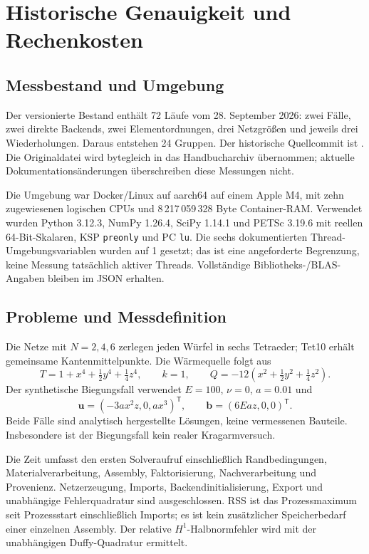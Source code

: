 \chapter{Historische Genauigkeit und Rechenkosten}
\section{Messbestand und Umgebung}
Der versionierte Bestand
 enthält 72 Läufe vom
28. September 2026: zwei Fälle, zwei direkte Backends, zwei Elementordnungen,
drei Netzgrößen und jeweils drei Wiederholungen. Daraus entstehen 24 Gruppen.
Der historische Quellcommit ist
.
Die Originaldatei wird bytegleich in das Handbucharchiv übernommen; aktuelle
Dokumentationsänderungen überschreiben diese Messungen nicht.

Die Umgebung war Docker/Linux auf aarch64 auf einem Apple M4, mit zehn
zugewiesenen logischen CPUs und 8\,217\,059\,328 Byte Container-RAM.
Verwendet wurden Python 3.12.3, NumPy 1.26.4, SciPy 1.14.1 und
PETSc 3.19.6 mit reellen 64-Bit-Skalaren, KSP \texttt{preonly} und PC
\texttt{lu}. Die sechs dokumentierten Thread-Umgebungsvariablen wurden auf 1
gesetzt; das ist eine angeforderte Begrenzung, keine Messung tatsächlich
aktiver Threads. Vollständige Bibliotheks-/BLAS-Angaben bleiben im JSON erhalten.

\section{Probleme und Messdefinition}
Die Netze mit $N=2,4,6$ zerlegen jeden Würfel in sechs Tetraeder; Tet10 erhält
gemeinsame Kantenmittelpunkte. Die Wärmequelle folgt aus
\begin{equation}
 T=1+x^4+\tfrac12y^4+\tfrac14z^4,\qquad
 k=1,\qquad Q=-12(x^2+\tfrac12y^2+\tfrac14z^2).
\end{equation}
Der synthetische Biegungsfall verwendet $E=100$, $\nu=0$, $a=0.01$ und
\begin{equation}
 \mathbf u=(-3ax^2z,0,ax^3)^\mathsf T,\qquad
 \mathbf b=(6Eaz,0,0)^\mathsf T.
\end{equation}
Beide Fälle sind analytisch hergestellte Lösungen, keine vermessenen Bauteile.
Insbesondere ist der Biegungsfall kein realer Kragarmversuch.

Die Zeit umfasst den ersten Solveraufruf einschließlich Randbedingungen,
Materialverarbeitung, Assembly, Faktorisierung, Nachverarbeitung und Provenienz.
Netzerzeugung, Imports, Backendinitialisierung, Export und unabhängige
Fehlerquadratur sind ausgeschlossen. RSS ist das Prozessmaximum seit
Prozessstart einschließlich Imports; es ist kein zusätzlicher Speicherbedarf
einer einzelnen Assembly. Der relative $H^1$-Halbnormfehler wird mit der
unabhängigen Duffy-Quadratur ermittelt.

